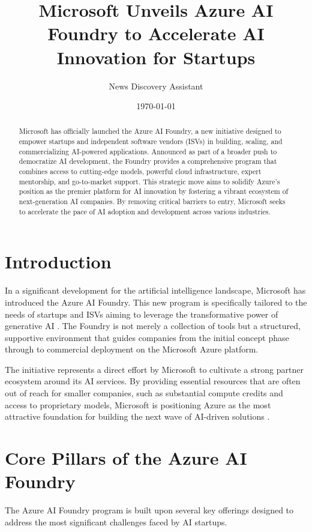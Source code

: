 \documentclass{article}
\title{\textbf{Microsoft Unveils Azure AI Foundry to Accelerate AI Innovation for Startups}}
\author{News Discovery Assistant}
\date{\today}
\begin{document}
\maketitle

\begin{abstract}
Microsoft has officially launched the Azure AI Foundry, a new initiative designed to empower startups and independent software vendors (ISVs) in building, scaling, and commercializing AI-powered applications. Announced as part of a broader push to democratize AI development, the Foundry provides a comprehensive program that combines access to cutting-edge models, powerful cloud infrastructure, expert mentorship, and go-to-market support. This strategic move aims to solidify Azure's position as the premier platform for AI innovation by fostering a vibrant ecosystem of next-generation AI companies. By removing critical barriers to entry, Microsoft seeks to accelerate the pace of AI adoption and development across various industries.
\end{abstract}

\section{Introduction}
In a significant development for the artificial intelligence landscape, Microsoft has introduced the Azure AI Foundry. This new program is specifically tailored to the needs of startups and ISVs aiming to leverage the transformative power of generative AI \citep{azure_blog_2024}. The Foundry is not merely a collection of tools but a structured, supportive environment that guides companies from the initial concept phase through to commercial deployment on the Microsoft Azure platform.

The initiative represents a direct effort by Microsoft to cultivate a strong partner ecosystem around its AI services. By providing essential resources that are often out of reach for smaller companies, such as substantial compute credits and access to proprietary models, Microsoft is positioning Azure as the most attractive foundation for building the next wave of AI-driven solutions \citep{techcrunch_foundry_2024}.

\section{Core Pillars of the Azure AI Foundry}
The Azure AI Foundry program is built upon several key offerings designed to address the most significant challenges faced by AI startups.
\end{document}

